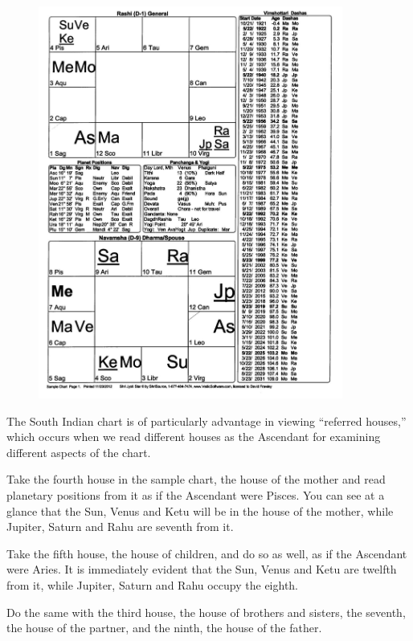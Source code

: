  \begin{figure}[h]
\centering
\includegraphics[width=10cm]{pics/Lesson-1-southchart2.jpg}
\caption{}
\end{figure}


 


 

The South Indian chart is of particularly advantage in viewing “referred houses,” which occurs when we read different houses as the Ascendant for examining different aspects of the chart.

 

Take the fourth house in the sample chart, the house of the mother and read planetary positions from it as if the Ascendant were Pisces. You can see at a glance that the Sun, Venus and Ketu will be in the house of the mother, while Jupiter, Saturn and Rahu are seventh from it.

 

Take the fifth house, the house of children, and do so as well, as if the Ascendant were Aries. It is immediately evident that the Sun, Venus and Ketu are twelfth from it, while Jupiter, Saturn and Rahu occupy the eighth.

 

Do the same with the third house, the house of brothers and sisters, the seventh, the house of the partner, and the ninth, the house of the father.

